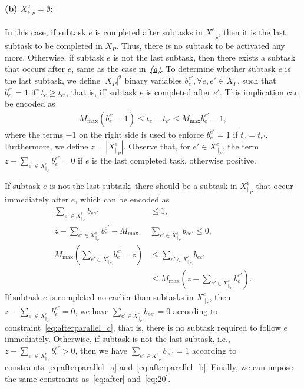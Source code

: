 \documentclass[Afour,sageh,times]{sagej}
\begin{document}
{{{\paragraph{(b)  $ X^e_{\succ_{P}} = \emptyset$:} In this case, if subtask $e$ is completed after  subtasks in  $X_{\|_P}^e$, then it is the last  subtask  to be completed in  $X_P$. Thus, there is no subtask to be activated any more. Otherwise, if subtask $e$ is not the last subtask, then there exists a subtask that occurs after $e$, same as the case in~\hyperref[activation:a]{\it (a)}. To determine whether subtask $e$ is the last subtask, we define $|X_P|^2$ binary variables $b_{e}^{e'}, \forall e, e' \in X_P$,  such that $b_{e}^{e'}=1$  iff $t_{e} \geq t_{e'}$, that is, iff subtask $e$ is completed after $e'$. This implication can be encoded as
\begingroup\makeatletter\def\f@size{10}\check@mathfonts
\def\maketag@@@#1{\hbox{\m@th\normalsize\normalfont#1}}%
\begin{align}
  M_{\text{max}} (b_{e}^{e'} - 1) \leq t_e -  t_{e'} \leq M_{\text{max}} b_{e}^{e'} -1,
\end{align}
  \endgroup
 where the terms $-1$ on the right side is used to enforce $b_{e}^{e'}=1$ if $t_e = t_{e'}$. Furthermore, we define $z = |X^e_{\|_{P}}|$. Observe that, for $e' \in X^e_{\|_{P}} $, the term $z -  \sum_{e' \in X^e_{\|_{P}}  } b_{e}^{e'} = 0$ if $e$ is the last completed task, otherwise  positive.

If subtask $e$ is not the last subtask, there should be a subtask in $X^e_{\|_{P}}$ that occur immediately after $e$, which can be encoded as
\begingroup\makeatletter\def\f@size{10}\check@mathfonts
\def\maketag@@@#1{\hbox{\m@th\normalsize\normalfont#1}}%
\begin{subequations}\label{eq:afterparallel}
  \begin{align}
  \sum_{e' \in X_{\|_P}^e} b_{ee'} & \le 1,\label{eq:afterparallel_a}\\
  z - \sum_{e' \in X^e_{\|_{P}}  } b_{e}^{e'} - M_{\text{max}} & \sum_{e' \in X_{\|_P}^e} b_{ee'}  \leq 0, \label{eq:afterparallel_b} \\
  M_{\text{max}} ( \sum_{e' \in X^e_{\|_{P}}  } b_{e}^{e'} -   z ) & \leq   \sum_{e' \in X_{\|_P}^e} b_{ee'} \nonumber \\
  & \leq M_{\text{max}}(z -  \sum_{e' \in X^e_{\|_{P}}  } b_{e}^{e'}). \label{eq:afterparallel_c}
\end{align}
\end{subequations}
\endgroup
If subtask $e$ is completed no earlier than subtasks in  $X_{\|_P}^e$, then $z - \sum_{e' \in X^e_{\|_{P}}  } b_{e}^{e'} = 0$, we have $ \sum_{e' \in X_{\|_P}^e} b_{ee'}=0$ according to constraint~\eqref{eq:afterparallel_c}, that is, there is no subtask required to follow $e$ immediately. Otherwise, if subtask is not the last subtask, i.e., $z - \sum_{e' \in X^e_{\|_{P}}  } b_{e}^{e'} > 0$, then we have $ \sum_{e' \in X_{\|_P}^e} b_{ee'}=1$ according to constraints~\eqref{eq:afterparallel_a} and~\eqref{eq:afterparallel_b}. Finally, we can impose the same constraints as~\eqref{eq:after} and~\eqref{eq:20}.

}}}
\end{document}
